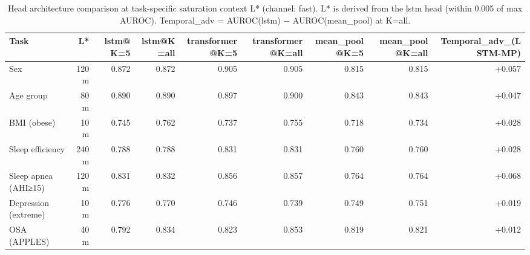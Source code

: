 \begin{table}[ht]
\centering
\caption{Head architecture comparison at task-specific saturation context L* (channel: fast). L* is derived from the lstm head (within 0.005 of max AUROC). Temporal\_adv = AUROC(lstm) − AUROC(mean\_pool) at K=all.}
\label{tab:heads_fast}
\begin{tabular}{lrrrrrrrr}
\toprule
Task & L* & lstm@K=5 & lstm@K=all & transformer@K=5 & transformer@K=all & mean_pool@K=5 & mean_pool@K=all & Temporal_adv_(LSTM-MP) \\
\midrule
Sex & 120m & 0.872 & 0.872 & 0.905 & 0.905 & 0.815 & 0.815 & +0.057 \\
Age group & 80m & 0.890 & 0.890 & 0.897 & 0.900 & 0.843 & 0.843 & +0.047 \\
BMI (obese) & 10m & 0.745 & 0.762 & 0.737 & 0.755 & 0.718 & 0.734 & +0.028 \\
Sleep efficiency & 240m & 0.788 & 0.788 & 0.831 & 0.831 & 0.760 & 0.760 & +0.028 \\
Sleep apnea (AHI≥15) & 120m & 0.831 & 0.832 & 0.856 & 0.857 & 0.764 & 0.764 & +0.068 \\
Depression (extreme) & 10m & 0.776 & 0.770 & 0.746 & 0.739 & 0.749 & 0.751 & +0.019 \\
OSA (APPLES) & 40m & 0.792 & 0.834 & 0.823 & 0.853 & 0.819 & 0.821 & +0.012 \\
\bottomrule
\end{tabular}
\end{table}